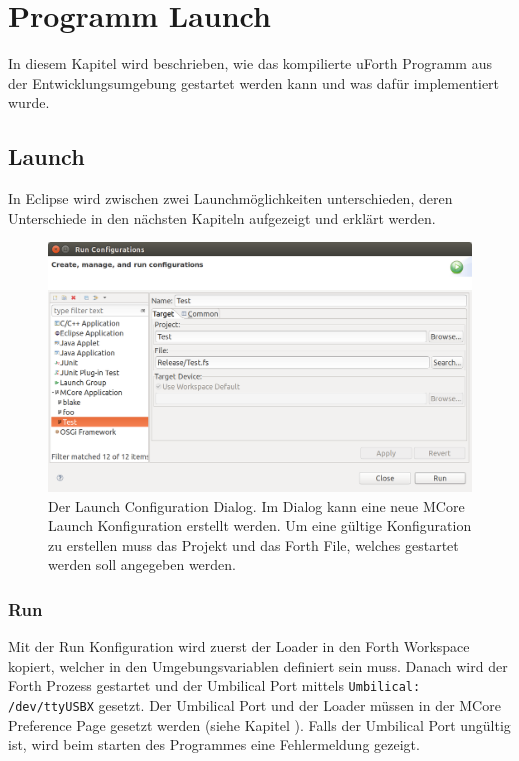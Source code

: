 \chapter{Programm Launch}
\label{chap:programlaunch}
In diesem Kapitel wird beschrieben, wie das kompilierte uForth Programm aus der Entwicklungsumgebung gestartet werden kann und was dafür implementiert wurde.

\section{Launch}

In Eclipse wird zwischen zwei Launchmöglichkeiten unterschieden, deren Unterschiede in den nächsten Kapiteln aufgezeigt und erklärt werden.

\begin{figure}[H]
	\centering
		\includegraphics[scale=0.3]{launch/run.png}
		\caption{Der Launch Configuration Dialog. Im Dialog kann eine neue MCore Launch Konfiguration erstellt werden. Um eine gültige Konfiguration zu erstellen muss das Projekt und das Forth File, welches gestartet werden soll angegeben werden.}
		\label{fig:run}
\end{figure}

\newpage
\subsection{Run}

Mit der Run Konfiguration wird zuerst der Loader in den Forth Workspace kopiert, welcher in den Umgebungsvariablen definiert sein muss. Danach wird der Forth Prozess gestartet und der Umbilical Port mittels \verb!Umbilical: /dev/ttyUSBX! gesetzt. Der Umbilical Port und der Loader müssen in der MCore Preference Page gesetzt werden (siehe Kapitel ). Falls der Umbilical Port ungültig ist, wird beim starten des Programmes eine Fehlermeldung gezeigt.

